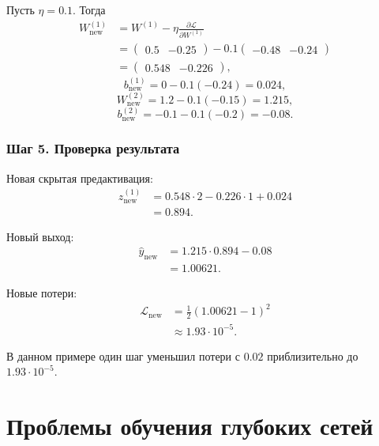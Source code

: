 \documentclass[12pt,a4paper]{article}
\theoremstyle{plain}
\theoremstyle{definition}
\theoremstyle{remark}
\begin{document}
Пусть $\eta=0.1$. Тогда
\[
\begin{aligned}
    W_{\mathrm{new}}^{(1)}
    &=
    W^{(1)}
    -
    \eta
    \frac{\partial\mathcal{L}}{\partial W^{(1)}}\\
    &=
    \begin{pmatrix}
        0.5&-0.25
    \end{pmatrix}
    -
    0.1
    \begin{pmatrix}
        -0.48&-0.24
    \end{pmatrix}\\
    &=
    \begin{pmatrix}
        0.548&-0.226
    \end{pmatrix},
\end{aligned}
\]
\[
    b_{\mathrm{new}}^{(1)}
    =
    0-0.1(-0.24)
    =
    0.024,
\]
\[
    W_{\mathrm{new}}^{(2)}
    =
    1.2-0.1(-0.15)
    =
    1.215,
\]
\[
    b_{\mathrm{new}}^{(2)}
    =
    -0.1-0.1(-0.2)
    =
    -0.08.
\]

\subsubsection*{Шаг 5. Проверка результата}

Новая скрытая предактивация:
\[
\begin{aligned}
    z_{\mathrm{new}}^{(1)}
    &=
    0.548\cdot 2
    -
    0.226\cdot 1
    +
    0.024\\
    &=
    0.894.
\end{aligned}
\]

Новый выход:
\[
\begin{aligned}
    \widehat{y}_{\mathrm{new}}
    &=
    1.215\cdot 0.894-0.08\\
    &=
    1.00621.
\end{aligned}
\]

Новые потери:
\[
\begin{aligned}
    \mathcal{L}_{\mathrm{new}}
    &=
    \frac{1}{2}(1.00621-1)^2\\
    &\approx
    1.93\cdot 10^{-5}.
\end{aligned}
\]

В данном примере один шаг уменьшил потери с $0.02$ приблизительно
до $1.93\cdot 10^{-5}$.

\section{Проблемы обучения глубоких сетей}
\end{document}
